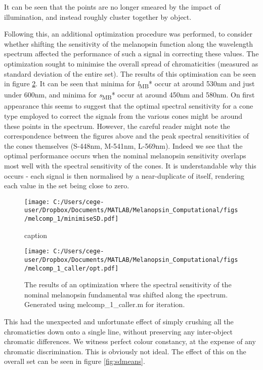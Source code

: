 \documentclass{article}
\begin{document}
It can be seen that the points are no longer smeared by the impact of illumination, and instead roughly cluster together by object.

Following this, an additional optimization procedure was performed, to consider whether shifting the sensitivity of the melanopsin function along the wavelength spectrum affected the performance of such a signal in correcting these values. The optimization sought to minimise the overall spread of chromaticities (measured as standard deviation of the entire set). The results of this optimisation can be seen in figure \ref{fig:opt}. It can be seen that minima for \textit{l}\textsubscript{MB}* occur at around 530nm and just under 600nm, and minima for \textit{s}\textsubscript{MB}* occur at around 450nm and 580nm. On first appearance this seems to suggest that the optimal spectral sensitivity for a cone type employed to correct the signals from the various cones might be around these points in the spectrum. However, the careful reader might note the correspondence between the figures above and the peak spectral sensitivities of the cones themselves (S-448nm, M-541nm, L-569nm). Indeed we see that the optimal performance occurs when the nominal melanopsin sensitivity overlaps most well with the spectral sensitivity of the cones. It is understandable why this occurs - each signal is then normalised by a near-duplicate of itself, rendering each value in the set being close to zero.

\begin{figure}[ht]
    \centering
    \texttt{[image: C:/Users/cege-user/Dropbox/Documents/MATLAB/Melanopsin\_Computational/figs/melcomp\_1/minimiseSD.pdf]}
    \caption{caption}
    \label{fig:opt}
\end{figure} 

\begin{figure}[ht]
    \centering
    \texttt{[image: C:/Users/cege-user/Dropbox/Documents/MATLAB/Melanopsin\_Computational/figs/melcomp\_1\_caller/opt.pdf]}
    \caption{The results of an optimization where the spectral sensitivity of the nominal melanopsin fundamental was shifted along the spectrum. Generated using melcomp\_1\_caller.m for iteration.}
    \label{fig:opt}
\end{figure} 

This had the unexpected and unfortunate effect of simply crushing all the chromaticties down onto a single line, without preserving any inter-object chromatic differences. We witness perfect colour constancy, at the expense of any chromatic discrimination. This is obviously not ideal. The effect of this on the overall set can be seen in figure \ref{fig:sdmeans}.
\end{document}
